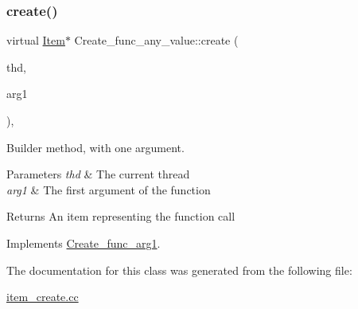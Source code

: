 \subsubsection{\texorpdfstring{create()}{create()}}
{\footnotesize\ttfamily virtual \mbox{\hyperlink{classItem}{Item}}$\ast$ Create\+\_\+func\+\_\+any\+\_\+value\+::create (\begin{DoxyParamCaption}\item[{T\+HD $\ast$}]{thd,  }\item[{\mbox{\hyperlink{classItem}{Item}} $\ast$}]{arg1 }\end{DoxyParamCaption})\hspace{0.3cm}{\ttfamily [inline]}, {\ttfamily [virtual]}}

Builder method, with one argument. 
\begin{DoxyParams}{Parameters}
{\em thd} & The current thread \\
\hline
{\em arg1} & The first argument of the function \\
\hline
\end{DoxyParams}
\begin{DoxyReturn}{Returns}
An item representing the function call 
\end{DoxyReturn}


Implements \mbox{\hyperlink{classCreate__func__arg1_a3e9a98f755cd82c3e762e334c955a8c9}{Create\+\_\+func\+\_\+arg1}}.



The documentation for this class was generated from the following file\+:\begin{DoxyCompactItemize}
\item 
\mbox{\hyperlink{item__create_8cc}{item\+\_\+create.\+cc}}\end{DoxyCompactItemize}
